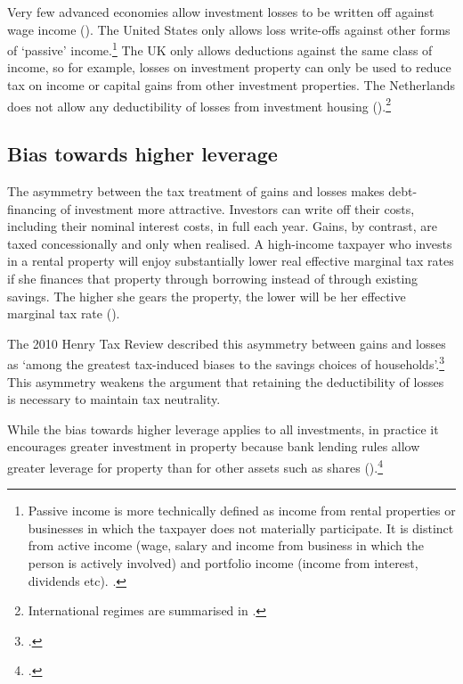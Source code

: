 Very few advanced economies allow investment losses to be written off against wage income (). 
The United States only allows loss write-offs against other forms of ‘passive’ income.\footnote{Passive income\label{footnote:passive-income} is more technically defined as income from rental properties or businesses in which the taxpayer does not materially participate. It is distinct from active income (wage, salary and income from business in which the person is actively involved) and portfolio income (income from interest, dividends etc). \textcite[See:][]{IRS2015}.} 
The UK only allows deductions against the same class of income, so for example, losses on investment property can only be used to reduce tax on income or capital gains from other investment properties. 
The Netherlands does not allow any deductibility of losses from investment housing ().\footnote{International regimes are summarised in \textcites[][43]{RBA2014SubmissionAffordableHousingInquiry}[][86]{ProductivityCommission2004FirstHomeOwnership}[][92--95]{ODonnell2005}.}

\subsection{Bias towards higher leverage}

The asymmetry between the tax treatment of gains and losses makes debt-financing of investment more attractive. Investors can write off their costs, including their nominal interest costs, in full each year. 
Gains, by contrast, are taxed concessionally and only when realised. 
A high-income taxpayer who invests in a rental property will enjoy substantially lower real effective marginal tax rates if she finances that property through borrowing instead of through existing savings. The higher she gears the property, the lower will be her effective marginal tax rate (). 

The 2010 Henry Tax Review described this asymmetry between gains and losses as ‘among the greatest tax-induced biases to the savings choices of households’.\footcite[][69]{HenryTaxReview2010} This asymmetry weakens the argument that retaining the deductibility of losses is necessary to maintain tax neutrality.

While the bias towards higher leverage applies to all investments, in practice it encourages greater investment in property because bank lending rules allow greater leverage for property than for other assets such as shares ().\footcite[][23]{RBA2015SubmissionHomeOwnershipInquiry}  

